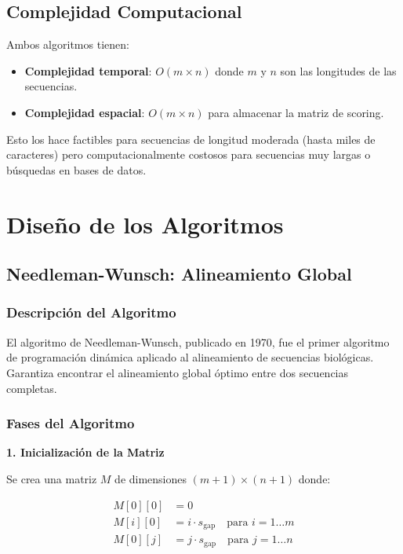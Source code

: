\documentclass[12pt,a4paper]{article}
\begin{document}
\subsection{Complejidad Computacional}

Ambos algoritmos tienen:

\begin{itemize}
    \item \textbf{Complejidad temporal}: $O(m \times n)$ donde $m$ y $n$ son las longitudes de las secuencias.
    \item \textbf{Complejidad espacial}: $O(m \times n)$ para almacenar la matriz de scoring.
\end{itemize}

Esto los hace factibles para secuencias de longitud moderada (hasta miles de caracteres) pero computacionalmente costosos para secuencias muy largas o búsquedas en bases de datos.

\section{Diseño de los Algoritmos}

\subsection{Needleman-Wunsch: Alineamiento Global}

\subsubsection{Descripción del Algoritmo}

El algoritmo de Needleman-Wunsch, publicado en 1970, fue el primer algoritmo de programación dinámica aplicado al alineamiento de secuencias biológicas. Garantiza encontrar el alineamiento global óptimo entre dos secuencias completas.

\subsubsection{Fases del Algoritmo}

\textbf{1. Inicialización de la Matriz}

Se crea una matriz $M$ de dimensiones $(m+1) \times (n+1)$ donde:

\begin{align}
M[0][0] &= 0 \\
M[i][0] &= i \cdot s_{\text{gap}} \quad \text{para } i = 1 \ldots m \\
M[0][j] &= j \cdot s_{\text{gap}} \quad \text{para } j = 1 \ldots n
\end{align}
\end{document}
